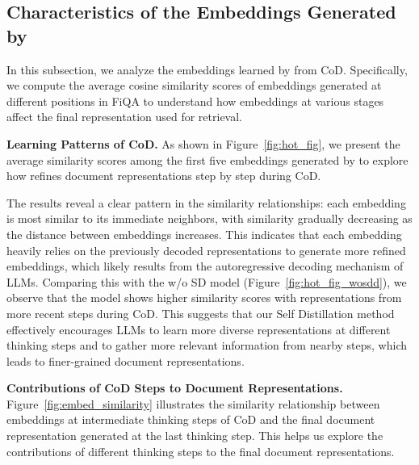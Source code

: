 \subsection{Characteristics of the Embeddings Generated by \method{}} 
In this subsection, we analyze the embeddings learned by \method{} from CoD. Specifically, we compute the average cosine similarity scores of embeddings generated at different positions in FiQA to understand how embeddings at various stages affect the final representation used for retrieval.

 

\textbf{Learning Patterns of CoD.} As shown in Figure~\ref{fig:hot_fig}, we present the average similarity scores among the first five embeddings generated by \method{} to explore how \method{} refines document representations step by step during CoD.

The results reveal a clear pattern in the similarity relationships: each embedding is most similar to its immediate neighbors, with similarity gradually decreasing as the distance between embeddings increases. This indicates that each embedding heavily relies on the previously decoded representations to generate more refined embeddings, which likely results from the autoregressive decoding mechanism of LLMs. Comparing this with the \method{} w/o SD model (Figure~\ref{fig:hot_fig_wosdd}), we observe that the \method{} model shows higher similarity scores with representations from more recent steps during CoD. This suggests that our Self Distillation method effectively encourages LLMs to learn more diverse representations at different thinking steps and to gather more relevant information from nearby steps, which leads to finer-grained document representations. %

\textbf{Contributions of CoD Steps to Document Representations.} Figure~\ref{fig:embed_similarity} illustrates the similarity relationship between embeddings at intermediate thinking steps of CoD and the final document representation generated at the last thinking step. This helps us explore the contributions of different thinking steps to the final document representations.

